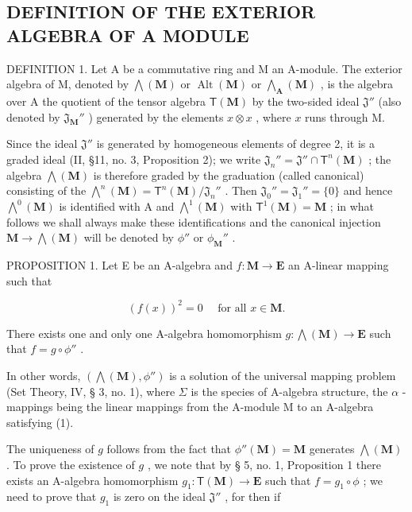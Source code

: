 \subsection{DEFINITION OF THE EXTERIOR ALGEBRA OF A MODULE}

DEFINITION 1. Let A be a commutative ring and M an A-module. The exterior algebra of M, denoted by \(\bigwedge (\mathbf{M})\) or \(\operatorname {Alt}(\mathbf{M})\) or \(\bigwedge_{\mathbf{A}}(\mathbf{M})\) , is the algebra over A the quotient of the tensor algebra \(\mathsf{T}(\mathbf{M})\) by the two-sided ideal \(\mathfrak{J}''\) (also denoted by \(\mathfrak{J}_{\mathbf{M}}''\) ) generated by the elements \(x\otimes x\) , where \(x\) runs through M.

Since the ideal \(\mathfrak{J}''\) is generated by homogeneous elements of degree 2, it is a graded ideal (II, §11, no. 3, Proposition 2); we write \(\mathfrak{J}_n'' = \mathfrak{J}'' \cap \mathsf{T}^n(\mathbf{M})\) ; the algebra \(\bigwedge(\mathbf{M})\) is therefore graded by the graduation (called canonical) consisting of the \(\bigwedge^n(\mathbf{M}) = \mathsf{T}^n(\mathbf{M}) / \mathfrak{J}_n''\) . Then \(\mathfrak{J}_0'' = \mathfrak{J}_1'' = \{0\}\) and hence \(\bigwedge^0(\mathbf{M})\) is identified with A and \(\bigwedge^1(\mathbf{M})\) with \(\mathsf{T}^1(\mathbf{M}) = \mathbf{M}\) ; in what follows we shall always make these identifications and the canonical injection \(\mathbf{M} \to \bigwedge(\mathbf{M})\) will be denoted by \(\phi''\) or \(\phi_{\mathbf{M}}''\) .

PROPOSITION 1. Let E be an A-algebra and \(f: \mathbf{M} \to \mathbf{E}\) an A-linear mapping such that

\[
(f (x)) ^ {2} = 0 \quad \text { for all } x \in \mathbf {M}.\tag{1}
\]

There exists one and only one A-algebra homomorphism \(g: \bigwedge(\mathbf{M}) \to \mathbf{E}\) such that \(f = g \circ \phi''\) .

In other words, \((\bigwedge (\mathbf{M}),\phi '')\) is a solution of the universal mapping problem (Set Theory, IV, § 3, no. 1), where \(\Sigma\) is the species of A-algebra structure, the \(\alpha\) -mappings being the linear mappings from the A-module M to an A-algebra satisfying (1).

The uniqueness of \(g\) follows from the fact that \(\phi''(\mathbf{M}) = \mathbf{M}\) generates \(\bigwedge (\mathbf{M})\) . To prove the existence of \(g\) , we note that by § 5, no. 1, Proposition 1 there exists an A-algebra homomorphism \(g_1: \mathsf{T}(\mathbf{M}) \to \mathbf{E}\) such that \(f = g_1 \circ \phi\) ; we need to prove that \(g_1\) is zero on the ideal \(\mathfrak{J}''\) , for then if

